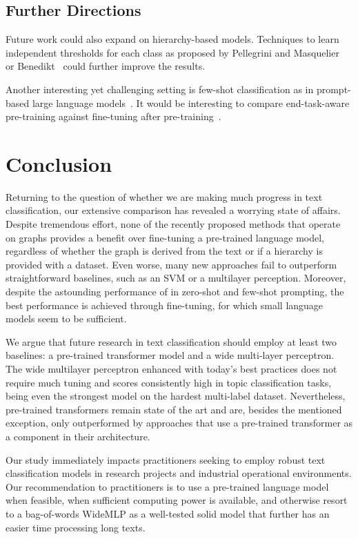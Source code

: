 \subsection{Further Directions}
Future work could also expand on hierarchy-based models.
Techniques to learn independent thresholds for each class as proposed by
Pellegrini and Masquelier~\cite{pellegrini2021fast} or
Benedikt~\etal\cite{benedict2021sigmoidf1} could further improve the results.

Another interesting yet challenging setting is few-shot classification as in prompt-based large language models~\cite{DBLP:conf/nips/BrownMRSKDNSSAA20}.
It would be interesting to compare end-task-aware pre-training against fine-tuning after pre-training~\cite{dery2021should}. 

\section{Conclusion}
Returning to the question of whether we are making much progress in text classification, our extensive comparison has revealed a worrying state of affairs.
Despite tremendous effort, none of the recently proposed methods that operate on graphs provides a benefit over fine-tuning a pre-trained language model, regardless of whether the graph is derived from the text or if a hierarchy is provided with a dataset.
Even worse, many new approaches fail to outperform straightforward baselines, such as an SVM or a multilayer perception.
Moreover, despite the astounding performance of \LLMs in zero-shot and few-shot prompting, the best performance is achieved through fine-tuning, for which small language models seem to be sufficient.
  
We argue that future research in text classification should employ at least two baselines: a pre-trained transformer model and a wide multi-layer perceptron. The wide multilayer perceptron enhanced with today's best practices does not require much tuning and scores consistently high in topic classification tasks, being even the strongest model on the hardest multi-label dataset. Nevertheless, pre-trained transformers remain state of the art and are, besides the mentioned exception, only outperformed by approaches that use a pre-trained transformer as a component in their architecture.

Our study immediately impacts practitioners seeking to employ robust text classification models in research projects and industrial operational environments. 
Our recommendation to practitioners is to use a pre-trained language model when feasible, \ie when sufficient computing power is available, and otherwise resort to a bag-of-words WideMLP as a well-tested solid model that further has an easier time processing long texts.

